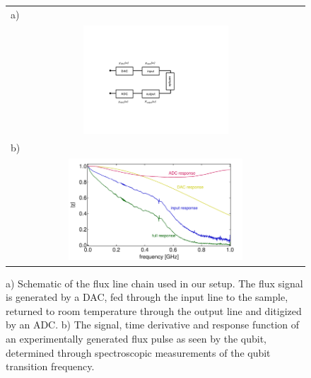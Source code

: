 \begin{figure}[ht!]
	\begin{center} 
	\begin{tabular}{c}
	 \multicolumn{1}{l}{a)} \\ \includegraphics[width=0.5\textwidth]{"./material/figures/measurement/fluxline_model"} \\
	 \multicolumn{1}{l}{b)} \\ \includegraphics[width=0.6\textwidth]{"./material_thesis/fluxline response/response"}
	 \end{tabular}
	\end{center}
	 \caption[]{a) Schematic of the flux line chain used in our setup. The flux signal is generated by a DAC, fed through the input line to the sample, returned to room temperature through the output line and ditigized by an ADC. b) The signal, time derivative and response function of an experimentally generated flux pulse as seen by the qubit, determined through spectroscopic measurements of the qubit transition frequency.}
	 \label{fig:FluxLineResponseFunction}
\end{figure}

